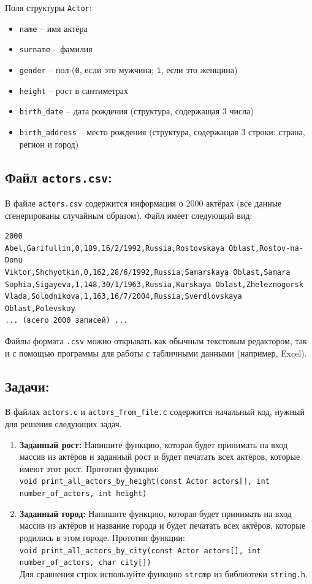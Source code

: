 \documentclass{article}
\begin{document}
Поля структуры \texttt{Actor}:
\begin{itemize}
\item \texttt{name} -- имя актёра
\item \texttt{surname} -- фамилия
\item \texttt{gender} -- пол (\texttt{0}, если это мужчина; \texttt{1}, если это женщина)
\item \texttt{height} -- рост в сантиметрах
\item \texttt{birth\_date} -- дата рождения (структура, содержащая 3 числа)
\item \texttt{birth\_address} -- место рождения (структура, содержащая 3 строки: страна, регион и город)
\end{itemize}


\subsection*{Файл \texttt{actors.csv}:}
В файле \texttt{actors.csv} содержится информация о 2000 актёрах (все данные сгенерированы случайным образом). Файл имеет следующий вид:
\begin{verbatim}
2000
Abel,Garifullin,0,189,16/2/1992,Russia,Rostovskaya Oblast,Rostov-na-Donu
Viktor,Shchyotkin,0,162,28/6/1992,Russia,Samarskaya Oblast,Samara
Sophia,Sigayeva,1,148,30/1/1963,Russia,Kurskaya Oblast,Zheleznogorsk
Vlada,Solodnikova,1,163,16/7/2004,Russia,Sverdlovskaya Oblast,Polevskoy
... (всего 2000 записей) ...
\end{verbatim}
Файлы формата \texttt{.csv} можно открывать как обычным текстовым редактором, так и с помощью программы для работы с табличными данными (например, Excel). 

\subsection*{Задачи:}
В файлах \texttt{actors.c} и \texttt{actors\_from\_file.c} содержится начальный код, нужный для решения следующих задач.
\begin{enumerate}
\item \textbf{Заданный рост:} Напишите функцию, которая будет принимать на вход массив из актёров и заданный рост и будет печатать всех актёров, которые имеют этот рост. Прототип функции:\\
\texttt{void print\_all\_actors\_by\_height(const Actor actors[], int number\_of\_actors, int height)}
\item \textbf{Заданный город:} Напишите функцию, которая будет принимать на вход массив из актёров и название города и будет печатать всех актёров, которые родились в этом городе. Прототип функции:\\
\texttt{void print\_all\_actors\_by\_city(const Actor actors[], int number\_of\_actors, char city[])}\\
Для сравнения строк используйте функцию \texttt{strcmp} из библиотеки \texttt{string.h}.
\end{enumerate}
\end{document}
